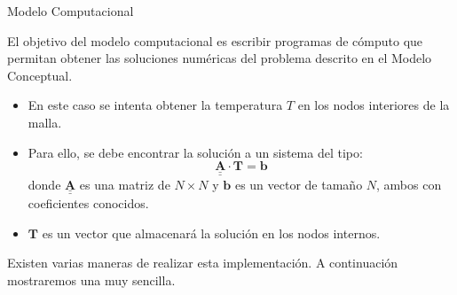 \documentclass{beamer}
\newcommand{\Vector}[1]{{\mathbf{#1}}}
\newcommand{\Tensor}[1]{\underline{\underline{\mathbf{#1}}}}
\begin{document}
\begin{frame}{Modelo Computacional}

El objetivo del modelo computacional es escribir programas de cómputo que
permitan obtener las soluciones numéricas del problema descrito en el Modelo Conceptual.
	
{\small
	\begin{itemize}
		\item En este caso se intenta obtener la temperatura $T$ en los nodos interiores de la
		malla.
		
		\item Para ello, se debe encontrar la solución a un sistema del tipo:
		\[\Tensor{A} \cdot \Vector{T} = \Vector{b}\]
		donde $\Tensor{A}$ es una matriz de $N \times N$ y $\Vector{b}$ es un vector de tamaño $N$, ambos con coeficientes conocidos.
		
		\item $\Vector{T}$ es un vector que almacenará la solución en los nodos internos.
	\end{itemize}
}

\strut

Existen varias maneras de realizar esta implementación. A continuación mostraremos una muy sencilla.

\end{frame}

\lstset{basicstyle=\tiny\ttfamily}
\lstset{frame=trbl}
\lstset{showstringspaces=false}
\end{document}
